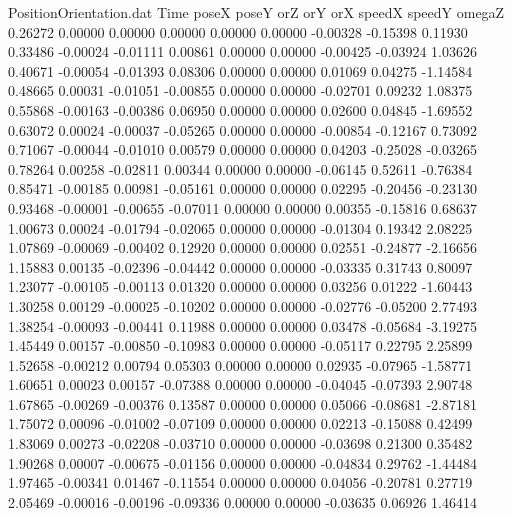\begin{filecontents}{PositionOrientation.dat}
Time poseX poseY orZ orY orX speedX speedY omegaZ
   0.26272    0.00000    0.00000     0.00000    0.00000    0.00000   -0.00328   -0.15398    0.11930
   0.33486   -0.00024   -0.01111     0.00861    0.00000    0.00000   -0.00425   -0.03924    1.03626
   0.40671   -0.00054   -0.01393     0.08306    0.00000    0.00000    0.01069    0.04275   -1.14584
   0.48665    0.00031   -0.01051    -0.00855    0.00000    0.00000   -0.02701    0.09232    1.08375
   0.55868   -0.00163   -0.00386     0.06950    0.00000    0.00000    0.02600    0.04845   -1.69552
   0.63072    0.00024   -0.00037    -0.05265    0.00000    0.00000   -0.00854   -0.12167    0.73092
   0.71067   -0.00044   -0.01010     0.00579    0.00000    0.00000    0.04203   -0.25028   -0.03265
   0.78264    0.00258   -0.02811     0.00344    0.00000    0.00000   -0.06145    0.52611   -0.76384
   0.85471   -0.00185    0.00981    -0.05161    0.00000    0.00000    0.02295   -0.20456   -0.23130
   0.93468   -0.00001   -0.00655    -0.07011    0.00000    0.00000    0.00355   -0.15816    0.68637
   1.00673    0.00024   -0.01794    -0.02065    0.00000    0.00000   -0.01304    0.19342    2.08225
   1.07869   -0.00069   -0.00402     0.12920    0.00000    0.00000    0.02551   -0.24877   -2.16656
   1.15883    0.00135   -0.02396    -0.04442    0.00000    0.00000   -0.03335    0.31743    0.80097
   1.23077   -0.00105   -0.00113     0.01320    0.00000    0.00000    0.03256    0.01222   -1.60443
   1.30258    0.00129   -0.00025    -0.10202    0.00000    0.00000   -0.02776   -0.05200    2.77493
   1.38254   -0.00093   -0.00441     0.11988    0.00000    0.00000    0.03478   -0.05684   -3.19275
   1.45449    0.00157   -0.00850    -0.10983    0.00000    0.00000   -0.05117    0.22795    2.25899
   1.52658   -0.00212    0.00794     0.05303    0.00000    0.00000    0.02935   -0.07965   -1.58771
   1.60651    0.00023    0.00157    -0.07388    0.00000    0.00000   -0.04045   -0.07393    2.90748
   1.67865   -0.00269   -0.00376     0.13587    0.00000    0.00000    0.05066   -0.08681   -2.87181
   1.75072    0.00096   -0.01002    -0.07109    0.00000    0.00000    0.02213   -0.15088    0.42499
   1.83069    0.00273   -0.02208    -0.03710    0.00000    0.00000   -0.03698    0.21300    0.35482
   1.90268    0.00007   -0.00675    -0.01156    0.00000    0.00000   -0.04834    0.29762   -1.44484
   1.97465   -0.00341    0.01467    -0.11554    0.00000    0.00000    0.04056   -0.20781    0.27719
   2.05469   -0.00016   -0.00196    -0.09336    0.00000    0.00000   -0.03635    0.06926    1.46414

\end{filecontents}
